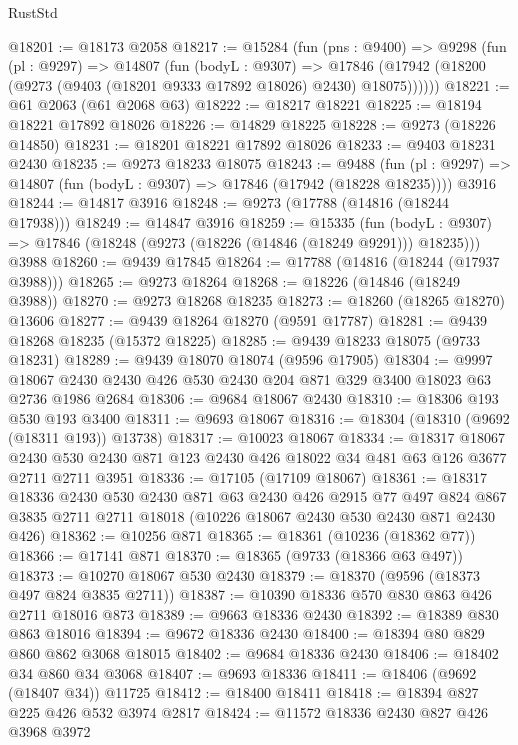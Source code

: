 \begin{lexlean}{RustStd}
\begin{coremodule}
{\begin{coremodule}
{{{{{{{{{{{{{{{{{{{{{{{{{{{{{{{{{{{{{{{{{{{{{{{{{{{{{{{@18201 := @18173 @2058
@18217 := @15284
    (fun (pns : @9400) =>
    @9298
      (fun (pl : @9297) =>
      @14807
        (fun (bodyL : @9307) =>
        @17846 (@17942 (@18200 (@9273 (@9403 (@18201 @9333 @17892 @18026) @2430) @18075))))))
@18221 := @61 @2063 (@61 @2068 @63)
@18222 := @18217 @18221
@18225 := @18194 @18221 @17892 @18026
@18226 := @14829 @18225
@18228 := @9273 (@18226 @14850)
@18231 := @18201 @18221 @17892 @18026
@18233 := @9403 @18231 @2430
@18235 := @9273 @18233 @18075
@18243 := @9488
    (fun (pl : @9297) => @14807 (fun (bodyL : @9307) => @17846 (@17942 (@18228 @18235))))
    @3916
@18244 := @14817 @3916
@18248 := @9273 (@17788 (@14816 (@18244 @17938)))
@18249 := @14847 @3916
@18259 := @15335
    (fun (bodyL : @9307) => @17846 (@18248 (@9273 (@18226 (@14846 (@18249 @9291))) @18235)))
    @3988
@18260 := @9439 @17845
@18264 := @17788 (@14816 (@18244 (@17937 @3988)))
@18265 := @9273 @18264
@18268 := @18226 (@14846 (@18249 @3988))
@18270 := @9273 @18268 @18235
@18273 := @18260 (@18265 @18270) @13606
@18277 := @9439 @18264 @18270 (@9591 @17787)
@18281 := @9439 @18268 @18235 (@15372 @18225)
@18285 := @9439 @18233 @18075 (@9733 @18231)
@18289 := @9439 @18070 @18074 (@9596 @17905)
@18304 := @9997 @18067 @2430 @2430 @426 @530 @2430 @204 @871 @329 @3400 @18023 @63 @2736 @1986 @2684
@18306 := @9684 @18067 @2430
@18310 := @18306 @193 @530 @193 @3400
@18311 := @9693 @18067
@18316 := @18304 (@18310 (@9692 (@18311 @193)) @13738)
@18317 := @10023 @18067
@18334 := @18317
    @18067
    @2430
    @530
    @2430
    @871
    @123
    @2430
    @426
    @18022
    @34
    @481
    @63
    @126
    @3677
    @2711
    @2711
    @3951
@18336 := @17105 (@17109 @18067)
@18361 := @18317
    @18336
    @2430
    @530
    @2430
    @871
    @63
    @2430
    @426
    @2915
    @77
    @497
    @824
    @867
    @3835
    @2711
    @2711
    @18018
    (@10226 @18067 @2430 @530 @2430 @871 @2430 @426)
@18362 := @10256 @871
@18365 := @18361 (@10236 (@18362 @77))
@18366 := @17141 @871
@18370 := @18365 (@9733 (@18366 @63 @497))
@18373 := @10270 @18067 @530 @2430
@18379 := @18370 (@9596 (@18373 @497 @824 @3835 @2711))
@18387 := @10390 @18336 @570 @830 @863 @426 @2711 @18016 @873
@18389 := @9663 @18336 @2430
@18392 := @18389 @830 @863 @18016
@18394 := @9672 @18336 @2430
@18400 := @18394 @80 @829 @860 @862 @3068 @18015
@18402 := @9684 @18336 @2430
@18406 := @18402 @34 @860 @34 @3068
@18407 := @9693 @18336
@18411 := @18406 (@9692 (@18407 @34)) @11725
@18412 := @18400 @18411
@18418 := @18394 @827 @225 @426 @532 @3974 @2817
@18424 := @11572 @18336 @2430 @827 @426 @3968 @3972
}}}}}}}}}}}}}}}}}}}}}}}}}}}}}}}}}}}}}}}}}}}}}}}}}}}}}}}
\end{coremodule}}
\end{coremodule}
\end{lexlean}
